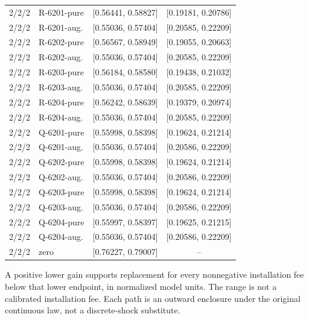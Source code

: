 {\begin{longtable}{rlcc}
2/2/2 & R-6201-pure & [0.56441, 0.58827] & [0.19181, 0.20786] \\
2/2/2 & R-6201-aug. & [0.55036, 0.57404] & [0.20585, 0.22209] \\
2/2/2 & R-6202-pure & [0.56567, 0.58949] & [0.19055, 0.20663] \\
2/2/2 & R-6202-aug. & [0.55036, 0.57404] & [0.20585, 0.22209] \\
2/2/2 & R-6203-pure & [0.56184, 0.58580] & [0.19438, 0.21032] \\
2/2/2 & R-6203-aug. & [0.55036, 0.57404] & [0.20585, 0.22209] \\
2/2/2 & R-6204-pure & [0.56242, 0.58639] & [0.19379, 0.20974] \\
2/2/2 & R-6204-aug. & [0.55036, 0.57404] & [0.20585, 0.22209] \\
2/2/2 & Q-6201-pure & [0.55998, 0.58398] & [0.19624, 0.21214] \\
2/2/2 & Q-6201-aug. & [0.55036, 0.57404] & [0.20586, 0.22209] \\
2/2/2 & Q-6202-pure & [0.55998, 0.58398] & [0.19624, 0.21214] \\
2/2/2 & Q-6202-aug. & [0.55036, 0.57404] & [0.20586, 0.22209] \\
2/2/2 & Q-6203-pure & [0.55998, 0.58398] & [0.19624, 0.21214] \\
2/2/2 & Q-6203-aug. & [0.55036, 0.57404] & [0.20586, 0.22209] \\
2/2/2 & Q-6204-pure & [0.55997, 0.58397] & [0.19625, 0.21215] \\
2/2/2 & Q-6204-aug. & [0.55036, 0.57404] & [0.20586, 0.22209] \\
2/2/2 & zero & [0.76227, 0.79007] & -- \\
\hline
\end{longtable}}
{\footnotesize A positive lower gain supports replacement for every nonnegative installation fee below that lower endpoint, in normalized model units. The range is not a calibrated installation fee. Each path is an outward enclosure under the original continuous law, not a discrete-shock substitute.}
